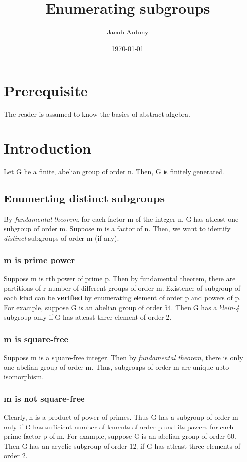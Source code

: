 \documentclass{article}
\title{Enumerating subgroups}
\author{Jacob Antony}
\date{\today}
\begin{document}
\maketitle

\tableofcontents

\section*{Prerequisite}
The reader is assumed to know the basics of abstract algebra.

\section{Introduction}
Let G be a finite, abelian group of order n. Then, G is finitely generated. 

\subsection{Enumerting distinct subgroups}
By \textit{fundamental theorem}, for each factor m of the integer n, G has atleast one subgroup of order m. Suppose m is a factor of n. Then, we want to identify \textit{distinct} subgroups of order m (if any).

\subsubsection*{m is prime power}
Suppose m is rth power of prime p. Then by fundamental theorem, there are partitions-of-r number of different groups of order m. Existence of subgroup of each kind can be \textbf{verified} by enumerating element of order p and powers of p. For example, suppose G is an abelian group of order 64. Then G has a \textit{klein-4} subgroup only if G has atleast three element of order 2. 

\subsubsection*{m is square-free}
Suppose m is a square-free integer. Then by \textit{fundamental theorem}, there is only one abelian group of order m. Thus, subgroups of order m are unique upto isomorphism.

\subsubsection*{m is not square-free}
Clearly, n is a product of power of primes. Thus G has a subgroup of order m only if G has sufficient number of lements of order p and its powers for each prime factor p of m. For example, suppose G is an abelian group of order 60. Then G has an acyclic subgroup of order 12, if G has atleast three elements of order 2.
\end{document}
